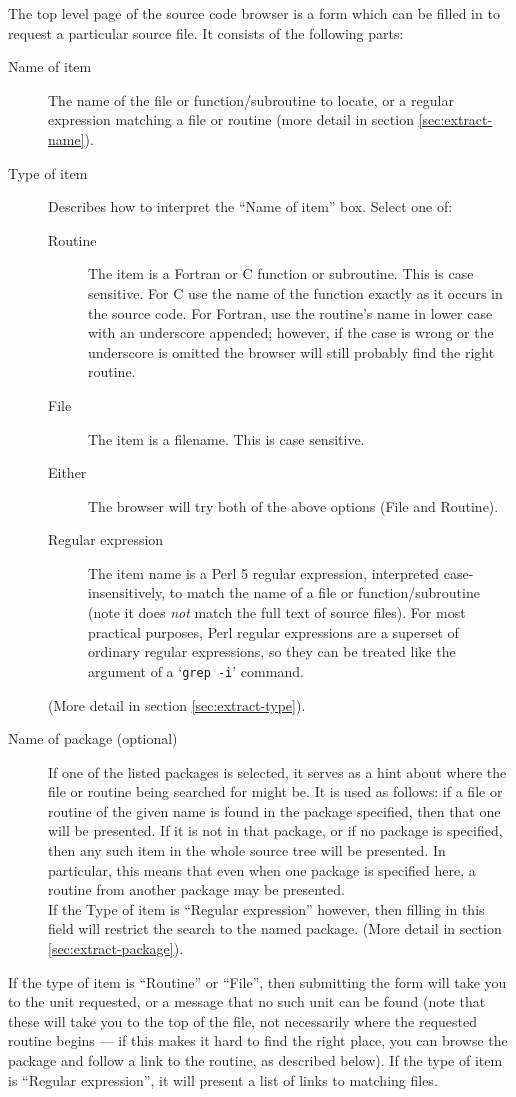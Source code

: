 \documentclass[twoside,11pt]{article}
\renewcommand{\_}{\texttt{\symbol{95}}}
\begin{document}
The top level page of the source code browser is a form
which can be filled in to request a particular source file.
It consists of the following parts:
\begin{description}
\item[Name of item]
The name of the file or function/subroutine to locate, 
or a regular expression matching a file or routine
(more detail in section \ref{sec:extract-name}).
\item[Type of item]
Describes how to interpret the ``Name of item'' box.  Select one of:
\begin{description}
   \item[Routine]
   The item is a Fortran or C function or subroutine.
   This is case sensitive.
   For C use the name of the function exactly as it occurs in the source code.
   For Fortran, use the routine's name in lower case with an 
   underscore appended;
   however, if the case is wrong or the underscore is omitted the 
   browser will still probably 
   find the right routine.
   \item[File]
   The item is a filename.  This is case sensitive.
   \item[Either]
   The browser will try both of the above options (File and Routine).
   \item[Regular expression]
   The item name is a Perl 5 regular expression, 
   interpreted case-insensitively,
   to match the name of a file or function/subroutine
   (note it does {\em not\/} match the full text of source files).
   For most practical purposes, Perl regular expressions are a superset
   of ordinary regular expressions, so they can be treated like the 
   argument of a `{\tt grep -i}' command.
\end{description}
(More detail in section \ref{sec:extract-type}).
\item[Name of package (optional)]
If one of the listed packages is selected, it serves
as a hint about where the file or routine being searched for might be.
It is used as follows: if a file or routine of the given name is found
in the package specified, then that one will be presented.
If it is not in that package, or if no package is specified, 
then any such item in the whole source tree will be presented.
In particular, this means that even when one package is specified here,
a routine from another package may be presented.\\
If the Type of item is ``Regular expression'' however, then filling in this
field will restrict the search to the named package.
(More detail in section \ref{sec:extract-package}).
\end{description}
If the type of item is ``Routine'' or ``File'', then submitting
the form will take you to the unit requested, or a message
that no such unit can be found
(note that these will take you to the top of the file,
not necessarily where the requested routine begins ---
if this makes it hard to find the right place, you can browse the
package and follow a link to the routine, as described below).
If the type of item is ``Regular expression'', 
it will present a list of links to
matching files.
\end{document}
